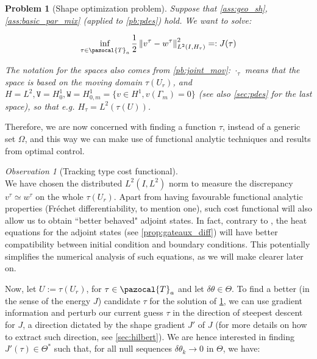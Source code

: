\documentclass[english,a4paper,9pt,oneside]{scrbook}	%
\theoremstyle{break}
\newtheorem{pb}[equation]{Problem}
\theoremstyle{remark}
\newtheorem{obs}[equation]{Observation}
\newcommand{\norm}[1]{\left\lVert#1\right\rVert}
\newcommand{\cT}{\pazocal{T}}
\newcommand{\te}{\theta}
\newcommand{\Te}{\Theta}
\newcommand{\tw}[1]{\texttt{#1}}
\begin{document}
\begin{pb}[Shape optimization problem]
\label{pb:shopt}
Suppose that \cref{ass:geo_sh}, \cref{ass:basic_par_mix} (applied to \cref{pb:pdes}) hold. We want to solve:

$$\inf_{\tau \in \cT_a}\frac{1}{2}\norm{v^\tau-w^\tau}_{L^2(I,H_\tau)}^2=:J(\tau)$$

The notation for the spaces also comes from  \cref{pb:joint_mov}: $\cdot_\tau$ means that the space is based on the moving domain $\tau(U_r)$, and $H=L^2, \tw{V}=H^1_0, \tw{W} = H^1_{0,m}=\{v \in H^1, v(\Gamma_m)=0\}$ (see also \cref{sec:pdes} for the last space), so that e.g. $H_\tau = L^2(\tau(U))$.

\end{pb}

Therefore, we are now concerned with finding a function $\tau$, instead of a generic set $\Omega$, and this way we can make use of functional analytic techniques and results from optimal control.



\begin{obs}[Tracking type cost functional]
\mbox{}\\
We have chosen the distributed $L^2(I,L^2)$ norm to measure the discrepancy $v^\tau\simeq w^\tau$ on the whole $\tau(U_r)$. Apart from having favourable functional analytic properties (Fréchet differentiability, to mention one), such cost functional will also allow us to obtain ``better behaved" adjoint states. In fact, contrary to \cite{harbrecht}, the heat equations for the adjoint states (see \cref{prop:gateaux_diff}) will have better compatibility between initial condition and boundary conditions. This potentially simplifies the numerical analysis of such equations, as we will make clearer later on.
\end{obs}


Now, let $U:=\tau(U_r)$, for $\tau \in \cT_a$ and let $\delta \te \in \Te$. To find a better (in the sense of the energy $J$) candidate $\tau$ for the solution of \cref{pb:shopt}, we can use gradient information and perturb our current guess $\tau$ in the direction of steepest descent for $J$, a direction dictated by the shape gradient $J'$ of $J$ (for more details on how to extract such direction, see \cref{sec:hilbert}). We are hence interested in finding $J'(\tau) \in \Te^*$ such that, for all null sequences $\delta \te_k \rightarrow 0$ in $\Te$, we have:
\end{document}
